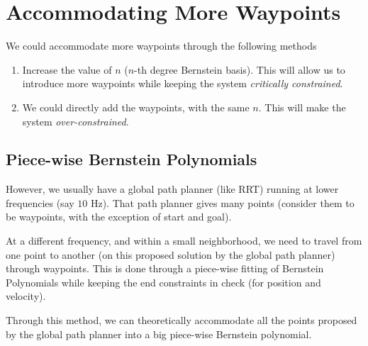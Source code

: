 \section{Accommodating More Waypoints}

We could accommodate more waypoints through the following methods

\begin{enumerate}
    \item Increase the value of $n$ ($n$-th degree Bernstein basis). This will allow us to introduce more waypoints while keeping the system \emph{critically constrained}.
    \item We could directly add the waypoints, with the same $n$. This will make the system \emph{over-constrained}.
\end{enumerate}

\subsection{Piece-wise Bernstein Polynomials}

However, we usually have a global path planner (like RRT) running at lower frequencies (say $10$ Hz). That path planner gives many points (consider them to be waypoints, with the exception of start and goal).

At a different frequency, and within a small neighborhood, we need to travel from one point to another (on this proposed solution by the global path planner) through waypoints. This is done through a piece-wise fitting of Bernstein Polynomials while keeping the end constraints in check (for position and velocity).

Through this method, we can theoretically accommodate all the points proposed by the global path planner into a big piece-wise Bernstein polynomial.
